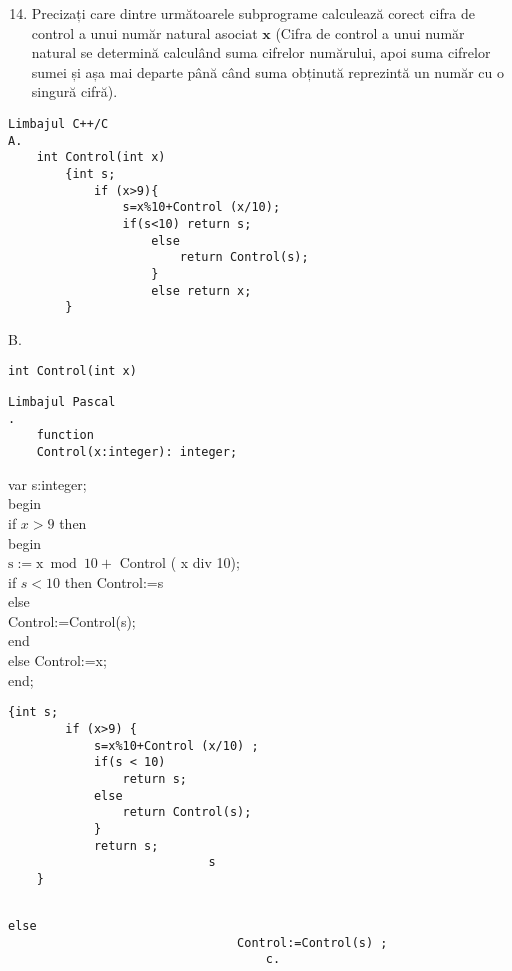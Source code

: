\begin{enumerate}
  \setcounter{enumi}{13}
  \item Precizați care dintre următoarele subprograme calculează corect cifra de control a unui număr natural asociat $\mathbf{x}$ (Cifra de control a unui număr natural se determină calculând suma cifrelor numărului, apoi suma cifrelor sumei și așa mai departe până când suma obținută reprezintă un număr cu o singură cifră).
\end{enumerate}

\begin{verbatim}
Limbajul C++/C
A.
    int Control(int x)
        {int s;
            if (x>9){
                s=x%10+Control (x/10);
                if(s<10) return s;
                    else
                        return Control(s);
                    }
                    else return x;
        }
\end{verbatim}

B.

\begin{verbatim}
int Control(int x)
\end{verbatim}

\begin{verbatim}
Limbajul Pascal
.
    function
    Control(x:integer): integer;
\end{verbatim}

var s:integer;\\
begin\\
if $x>9$ then\\
begin\\
$\mathrm{s}:=\mathrm{x} \bmod 10+$ Control ( x div 10);\\
if $s<10$ then Control:=s\\
else\\
Control:=Control(s);\\
end\\
else Control:=x;\\
end;

\begin{verbatim}
{int s;
        if (x>9) {
            s=x%10+Control (x/10) ;
            if(s < 10)
                return s;
            else
                return Control(s);
            }
            return s;
                            s
    }
\end{verbatim}

\begin{verbatim}
                                                                                                                                        else
                                Control:=Control(s) ;
                                    c.
\end{verbatim}

